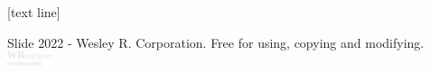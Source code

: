 
\usepackage{silence}
\WarningsOff[biblatex]


\renewcommand{\chaptername}{Capítulo}
\renewcommand{\contentsname}{Sumário}



[text line]{
    \parbox{0.95\linewidth}{
        \vspace*{-4em}
        Slide \insertpagenumber
        \hfill
        2022 - Wesley R. Corporation.
        Free for using, copying and modifying.
        \hfill
        \includegraphics[width=0.1\textwidth]{logos/logo_white.png}
    }}



